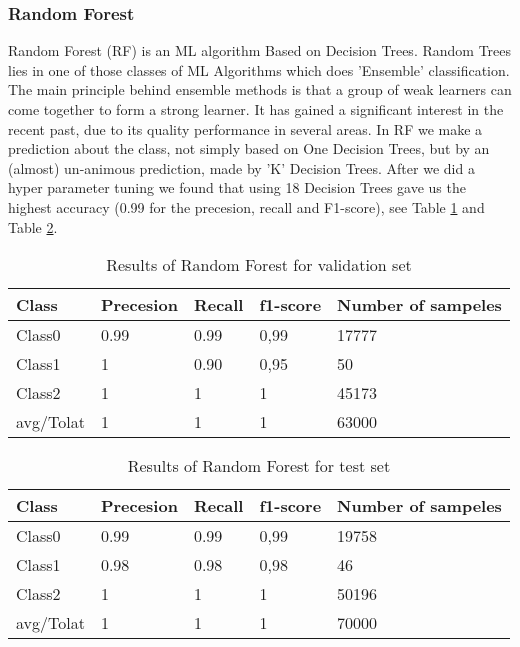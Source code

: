 \documentclass[a4paper,UKenglish]{lipics-v2016}
\begin{document}
 \subsubsection{Random Forest\label{random forest}}
 Random Forest (RF) is an ML algorithm Based on Decision Trees. Random Trees lies in one of those classes of ML Algorithms which does 'Ensemble' classification. The main principle behind ensemble methods is that a group of weak learners can come together to form a strong learner. It has gained a significant interest in the recent past, due to its quality performance in several areas. In RF we make a prediction about the class, not simply based on One Decision Trees, but by an (almost) un-animous prediction, made by 'K' Decision Trees.  After we did a hyper parameter tuning we found that using 18 Decision Trees gave us the highest accuracy (0.99 for the precesion, recall and F1-score), see Table \ref{table:characteristics2} and Table \ref{table:characteristics3}.

 \begin{table}
 \caption{Results of Random Forest for validation set }
 \small
 \begin{center}
 \setlength{\tabcolsep}{0.8em}
 \renewcommand{\arraystretch}{1.5}
 \begin{tabular}{|p{1cm}|p{ 1cm}|p{1cm}|p{1.5cm}|p{1.5cm}|}
 \hline
 {Class} & {Precesion}  & {Recall} & {f1-score}& {Number of sampeles}\\
 \hline
 Class0 & 0.99 & 0.99 & 0,99 & 17777\\
 \hline
 Class1 & 1 & 0.90 & 0,95 & 50\\
 \hline
 Class2 & 1 & 1  & 1& 45173\\
 \hline
 avg/Tolat & 1 & 1  & 1 & 63000\\
 \hline
 \end{tabular}
 \end{center}
 \label{table:characteristics2}
 \vspace{-5mm}
 \end{table}


 \begin{table}
 \caption{Results of Random Forest for test set}
 \small
 \begin{center}
 \setlength{\tabcolsep}{0.8em}
 \renewcommand{\arraystretch}{1.5}
 \begin{tabular}{|p{1cm}|p{ 1cm}|p{1cm}|p{1.5cm}|p{1.5cm}|}
 \hline
 {Class} & {Precesion}  & {Recall} & {f1-score}& {Number of sampeles}\\
 \hline
 Class0 & 0.99 & 0.99 & 0,99 & 19758\\
 \hline
 Class1 & 0.98& 0.98 & 0,98 & 46\\
 \hline
 Class2 & 1 & 1  & 1& 50196\\
 \hline
 avg/Tolat & 1 & 1  & 1 & 70000\\
 \hline
 \end{tabular}
 \end{center}
 \label{table:characteristics3}
 \vspace{-5mm}
 \end{table}
\end{document}
